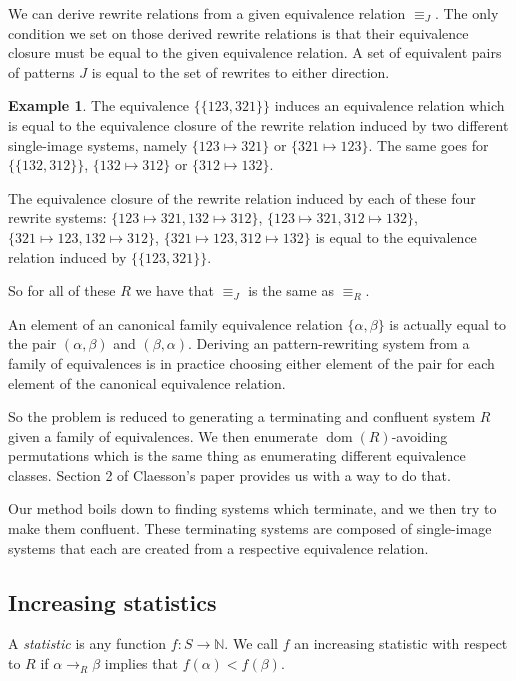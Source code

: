 \documentclass[openany, a4paper, 11pt, english]{article}
\newcommand{\patternrule}{ \mapsto \!}
\theoremstyle{definition}
\newtheorem{example}[theorem]{Example}
\newcommand{\Sym}{S}
\DeclareMathOperator{\dom}{dom}
\begin{document}
We can derive rewrite relations from a given equivalence relation $\equiv_J$.
The only condition we set on those derived rewrite relations is that their
equivalence closure must be equal to the given equivalence relation.
A set of equivalent pairs of patterns $J$ is equal to the set of rewrites to
either direction. 
\begin{example}
    The equivalence $\{ \{123, 321 \} \}$ induces an equivalence relation which is
    equal to the equivalence closure of the rewrite relation induced by two
    different single-image systems, namely $\{123 \patternrule 321\}$ or $\{321
    \patternrule 123\}$. The same goes for $\{ \{ 132, 312 \} \}$, $\{132 \patternrule
    312\}$ or $\{312 \patternrule 132\}$.

    The equivalence closure of the rewrite relation induced by each of these
    four rewrite systems: $\{123 \patternrule 321, 132 \patternrule 312\}$, $\{123
    \patternrule 321, 312 \patternrule 132\}$, $\{321 \patternrule 123, 132
    \patternrule 312\}$, $\{321 \patternrule 123, 312 \patternrule 132\}$ is
    equal to the equivalence relation induced by $\{ \{ 123, 321 \} \}$.

    So for all of these $R$ we have that $\equiv_J$ is the same as $\equiv_R$.
\end{example}

An element of an canonical family equivalence relation $\{ \alpha, \beta \}$ is
actually equal to the pair $(\alpha, \beta)$ and $(\beta, \alpha)$.
Deriving an pattern-rewriting system from a family of equivalences is in
practice choosing either element of the pair for each element of the canonical
equivalence relation.

So the problem is reduced to generating a terminating and confluent system $R$
given a family of equivalences. We then enumerate $\dom(R)$-avoiding
permutations which is the same thing as enumerating different equivalence
classes.  Section 2 of Claesson's paper provides us with a way to do that.
\cite{claesson:2021}

Our method boils down to finding systems which terminate, and we then try to
make them confluent. These terminating systems are composed of single-image
systems that each are created from a respective equivalence relation.

\subsection{Increasing statistics}
A \emph{statistic} is any function $f : \Sym \to \mathbb{N}$. We call $f$ an increasing
statistic with respect to $R$ if $\alpha \to_R \beta$ implies that $f(\alpha) < f(\beta)$.
\end{document}
